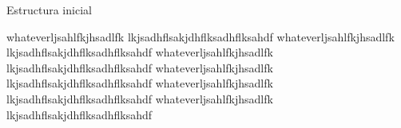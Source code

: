 \documentclass{article}
\begin{document}
\begin{singlespace}
  \begin{code}
    
    \caption{Estructura inicial}
  \end{code}
\end{singlespace}

\pagebreak

whateverljsahlfkjhsadlfk
lkjsadhflsakjdhflksadhflksahdf
whateverljsahlfkjhsadlfk
lkjsadhflsakjdhflksadhflksahdf
whateverljsahlfkjhsadlfk
lkjsadhflsakjdhflksadhflksahdf
whateverljsahlfkjhsadlfk
lkjsadhflsakjdhflksadhflksahdf
whateverljsahlfkjhsadlfk
lkjsadhflsakjdhflksadhflksahdf
whateverljsahlfkjhsadlfk
lkjsadhflsakjdhflksadhflksahdf

\pagebreak
\end{document}
